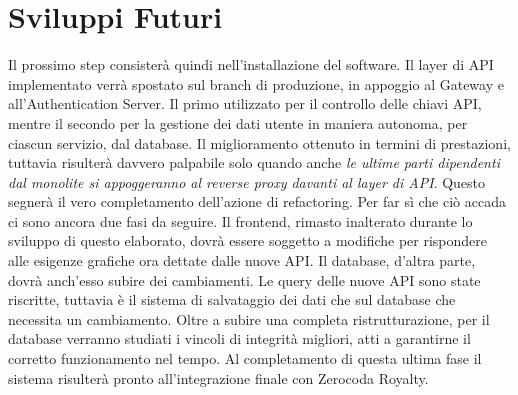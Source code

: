 \section{Sviluppi Futuri}
Il prossimo step consisterà quindi nell'installazione del software. Il layer di API implementato verrà spostato sul branch di produzione, in appoggio al Gateway e all'Authentication Server. Il primo utilizzato per il controllo delle chiavi API, mentre il secondo per la gestione dei dati utente in maniera autonoma, per ciascun servizio, dal database. Il miglioramento ottenuto in termini di prestazioni, tuttavia risulterà davvero palpabile solo quando anche \emph{le ultime parti dipendenti dal monolite si appoggeranno al reverse proxy davanti al layer di API}. Questo segnerà il vero completamento dell'azione di refactoring. Per far sì che ciò accada ci sono ancora due fasi da seguire. Il frontend, rimasto inalterato durante lo sviluppo di questo elaborato, dovrà essere soggetto a modifiche per rispondere alle esigenze grafiche ora dettate dalle nuove API. Il database, d'altra parte, dovrà anch'esso subire dei cambiamenti. Le query delle nuove API sono state riscritte, tuttavia è il sistema di salvataggio dei dati che sul database che necessita un cambiamento. Oltre a subire una completa ristrutturazione, per il database verranno studiati i vincoli di integrità migliori, atti a garantirne il corretto funzionamento nel tempo. Al completamento di questa ultima fase il sistema risulterà pronto all'integrazione finale con Zerocoda Royalty. 

